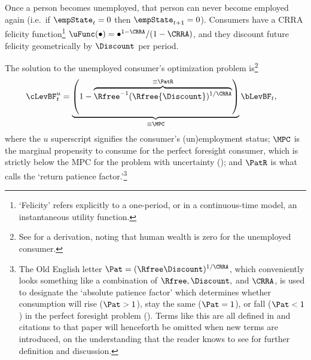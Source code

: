 \documentclass{\handout}
\begin{document}
Once a person becomes unemployed, that person can never become
employed again (i.e.\ if $\empState_{t}=0$ then $\empState_{t+1}=0$).
Consumers have a CRRA felicity function\footnote{`Felicity' refers
  explicitly to a one-period, or in a continuous-time model, an
  instantaneous utility function.}
$\uFunc(\bullet)= \bullet^{1-\CRRA}/(1-\CRRA)$, and they discount
future felicity geometrically by $\Discount$ per period.



The solution to the unemployed consumer's optimization problem
is\footnote{See  for a derivation, noting that human wealth is zero for the unemployed consumer.} 
\begin{equation}\begin{gathered}\begin{aligned}
        \cLevBF^{u}_{t} & =  \underbrace{\left(1-\overbrace{\Rfree ^{-1}(\Rfree{\Discount})^{1/\CRRA}}^{\equiv \PatR}\right)}_{\equiv \MPCU} \bLevBF_{t} \label{eq:cpfinfhorunemp} %
,
\end{aligned}\end{gathered}\end{equation}
where the $u$ superscript signifies the consumer's (un)employment
status; $\MPCU$ is the marginal propensity to consume for the perfect
foresight consumer, which is strictly below the MPC for the problem
with uncertainty (\cite{carroll&kimball:concavity}); and $\PatR$ is
what \cite{BufferStockTheory} calls the `return patience factor.'\footnote{The Old English letter $\Pat = (\Rfree \Discount)^{1/\CRRA}$, which conveniently looks something like a combination of $\Rfree, \Discount, $ and $\CRRA$, is used to designate the `absolute patience factor' which determines whether consumption will rise ($\Pat > 1$), stay the same ($\Pat = 1$), or fall ($\Pat < 1$) in the perfect foresight problem ().  Terms like this are all defined in \cite{carrollBSTheory} and citations to that paper will henceforth be omitted when new terms are introduced, on the understanding that the reader knows to see \cite{carrollBSTheory} for further definition and discussion.}
\end{document}
